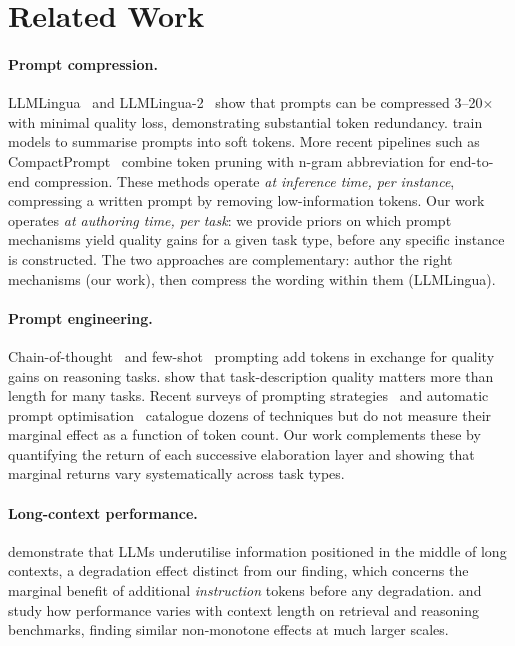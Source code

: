 \section{Related Work}
\label{sec:related}

\paragraph{Prompt compression.}
LLMLingua~\citep{jiang2023llmlingua} and LLMLingua-2~\citep{pan2024llmlingua2}
show that prompts can be compressed 3--20$\times$ with minimal quality loss,
demonstrating substantial token redundancy.
\citet{chevalier2023autocompressors} train models to summarise prompts into
soft tokens.
More recent pipelines such as CompactPrompt~\citep{wang2025compactprompt}
combine token pruning with n-gram abbreviation for end-to-end compression.
These methods operate \emph{at inference time, per instance}, compressing a
written prompt by removing low-information tokens.
Our work operates \emph{at authoring time, per task}: we provide priors on
which prompt mechanisms yield quality gains for a given task type, before
any specific instance is constructed.
The two approaches are complementary: author the right mechanisms (our work),
then compress the wording within them (LLMLingua).

\paragraph{Prompt engineering.}
Chain-of-thought~\citep{wei2022cot} and few-shot~\citep{brown2020gpt3}
prompting add tokens in exchange for quality gains on reasoning tasks.
\citet{zhou2022large} show that task-description quality matters more than
length for many tasks.
Recent surveys of prompting strategies~\citep{sahoo2024systematic,
schulhoff2024prompt} and automatic prompt
optimisation~\citep{amatriain2025survey} catalogue dozens of techniques but
do not measure their marginal effect as a function of token count.
Our work complements these by quantifying the return of each successive
elaboration layer and showing that marginal returns vary systematically
across task types.

\paragraph{Long-context performance.}
\citet{liu2023lost} demonstrate that LLMs underutilise information positioned
in the middle of long contexts, a degradation effect distinct from our
finding, which concerns the marginal benefit of additional \emph{instruction}
tokens before any degradation.
\citet{levy2024same} and \citet{hsieh2024ruler} study how performance varies
with context length on retrieval and reasoning benchmarks, finding similar
non-monotone effects at much larger scales.

